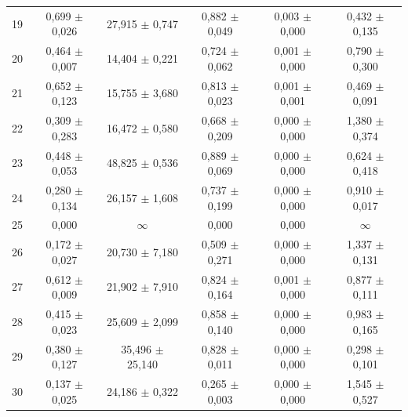 \begin{tabular}{l c c c c c}
19 & 0,699 $\pm$ 0,026 & 27,915 $\pm$ 0,747 & 0,882 $\pm$ 0,049 & 0,003 $\pm$ 0,000 & 0,432 $\pm$ 0,135 \\
20 & 0,464 $\pm$ 0,007 & 14,404 $\pm$ 0,221 & 0,724 $\pm$ 0,062 & 0,001 $\pm$ 0,000 & 0,790 $\pm$ 0,300 \\
21 & 0,652 $\pm$ 0,123 & 15,755 $\pm$ 3,680 & 0,813 $\pm$ 0,023 & 0,001 $\pm$ 0,001 & 0,469 $\pm$ 0,091 \\
22 & 0,309 $\pm$ 0,283 & 16,472 $\pm$ 0,580 & 0,668 $\pm$ 0,209 & 0,000 $\pm$ 0,000 & 1,380 $\pm$ 0,374 \\
23 & 0,448 $\pm$ 0,053 & 48,825 $\pm$ 0,536 & 0,889 $\pm$ 0,069 & 0,000 $\pm$ 0,000 & 0,624 $\pm$ 0,418 \\
24 & 0,280 $\pm$ 0,134 & 26,157 $\pm$ 1,608 & 0,737 $\pm$ 0,199 & 0,000 $\pm$ 0,000 & 0,910 $\pm$ 0,017 \\
25 & 0,000 & $\infty$ & 0,000 & 0,000 & $\infty$ \\
26 & 0,172 $\pm$ 0,027 & 20,730 $\pm$ 7,180 & 0,509 $\pm$ 0,271 & 0,000 $\pm$ 0,000 & 1,337 $\pm$ 0,131 \\
27 & 0,612 $\pm$ 0,009 & 21,902 $\pm$ 7,910 & 0,824 $\pm$ 0,164 & 0,001 $\pm$ 0,000 & 0,877 $\pm$ 0,111 \\
28 & 0,415 $\pm$ 0,023 & 25,609 $\pm$ 2,099 & 0,858 $\pm$ 0,140 & 0,000 $\pm$ 0,000 & 0,983 $\pm$ 0,165 \\
29 & 0,380 $\pm$ 0,127 & 35,496 $\pm$ 25,140 & 0,828 $\pm$ 0,011 & 0,000 $\pm$ 0,000 & 0,298 $\pm$ 0,101 \\
30 & 0,137 $\pm$ 0,025 & 24,186 $\pm$ 0,322 & 0,265 $\pm$ 0,003 & 0,000 $\pm$ 0,000 & 1,545 $\pm$ 0,527 \\
\hline 
 \end{tabular}
